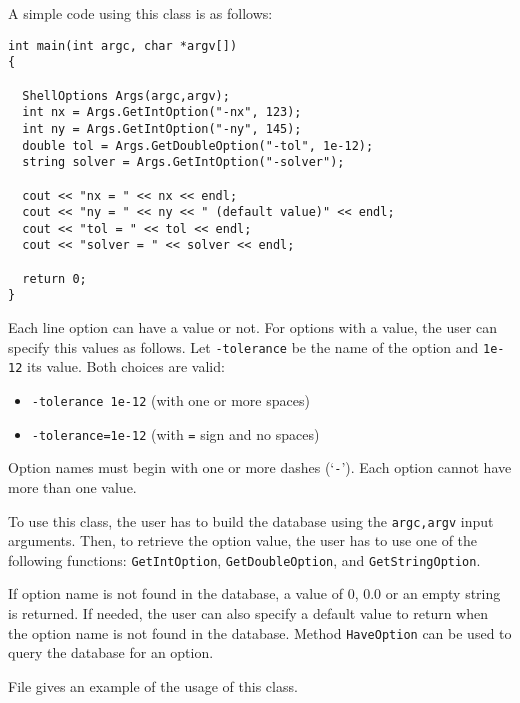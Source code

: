 A simple code using this class is as follows:
\begin{verbatim}
int main(int argc, char *argv[])
{

  ShellOptions Args(argc,argv);
  int nx = Args.GetIntOption("-nx", 123);
  int ny = Args.GetIntOption("-ny", 145);
  double tol = Args.GetDoubleOption("-tol", 1e-12);
  string solver = Args.GetIntOption("-solver");

  cout << "nx = " << nx << endl;
  cout << "ny = " << ny << " (default value)" << endl;
  cout << "tol = " << tol << endl;
  cout << "solver = " << solver << endl;

  return 0;
}
\end{verbatim}

Each line   option can have a value or not. For options with a value,
the user can specify this values as follows. Let \verb!-tolerance! be the
name of the option and \verb!1e-12! its value. Both choices are valid:
\begin{itemize}
\item \verb!-tolerance 1e-12! (with one or more spaces)
\item \verb!-tolerance=1e-12! (with \verb!=! sign and no spaces)
\end{itemize}

Option names must begin with one or more dashes (`\verb!-!'). Each option
cannot have more than one value.

To use this class, the user has to build the database using the 
\verb!argc,argv! input arguments. Then, to retrieve the option value, the user
 has to use one of the following functions:
\verb!GetIntOption!, \verb!GetDoubleOption!, and \verb!GetStringOption!.
 
If option name is not found in the database, a value of 0, 0.0 or an
 empty string is returned. If needed, the user can also specify a
 default value to return when the option name is not found in the
 database. Method \verb!HaveOption! can be used to query the database for
 an option.

File  gives an example of the usage of this class.
 
